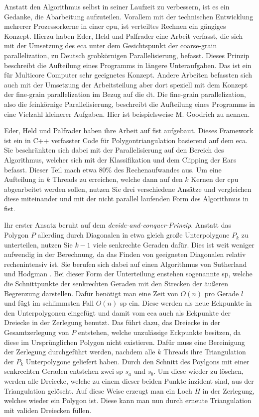 Anstatt den Algorithmus selbst in seiner Laufzeit zu verbessern, ist es ein Gedanke, die Abarbeitung aufzuteilen. Vorallem mit der technischen Entwicklung mehrerer Prozessorkerne in einer \ac{cpu},
ist verteiltes Rechnen ein gängiges Konzept. Hierzu haben Eder, Held und Palfrader eine Arbeit verfasst, die sich mit der Umsetzung des \ac{eca} unter dem Gesichtspunkt der coarse-grain parallelization,
zu Deutsch grobkörnigen Parallelisierung, befasst.\cite{paralleleca} Dieses Prinzip beschreibt die Aufteilung eines Programms in längere Unteraufgaben. Das ist ein für Multicore Computer sehr geeignetes Konzept.
Andere Arbeiten befassten sich auch mit der Umsetzung der Arbeitsteilung aber dort speziell mit dem Konzept der fine-grain parallelization im Bezug auf die \ac{dt}. Die fine-grain parallelization, also die feinkörnige 
Parallelisierung, beschreibt die Aufteilung eines Programms in eine Vielzahl kleinerer Aufgaben. 
Hier ist beispielsweise M. Goodrich\cite{goodrich} zu nennen.

Eder, Held und Palfrader haben ihre Arbeit auf \ac{fist} aufgebaut. Dieses Framework ist ein in C++ verfasster Code für Polygontriangulation basierend auf dem \ac{eca}.\cite{paralleleca}
Sie beschränkten sich dabei mit der Parallelisierung auf den Bereich des Algorithmus, welcher sich mit der Klassifikation und dem Clipping der Ears befasst. Dieser Teil mach etwa $80\%$ des Rechenaufwandes aus.
Um eine Aufteilung in $k$ Threads zu erreichen, welche dann auf den $k$ Kernen der \ac{cpu} abgearbeitet werden sollen, nutzen Sie drei verschiedene Ansätze und vergleichen diese miteinander und mit der nicht parallel 
laufenden Form des Algorithmus in \ac{fist}.

Ihr erster Ansatz beruht auf dem \emph{devide-and-conquer-Prinzip}. Anstatt das Polygon $P$ allerding durch Diagonalen in etwa gleich große Unterpolygone $P_k$ zu unterteilen, 
nutzen Sie $k-1$ viele senkrechte Geraden dafür. Dies ist weit weniger aufwendig in der Berechnung, da das Finden von geeigneten Diagonalen relativ rechenintensiv ist.
Sie berufen sich dabei auf einen Algorithmus von Sutherland und Hodgman \cite{dnc}. Bei dieser Form der Unterteilung enstehen sogenannte \ac{sp}, welche die Schnittpunkte der senkrechten Geraden mit 
den Strecken der äußeren Begrenzung darstellen. Dafür benötigt man eine Zeit von $O(n)$ pro Gerade $l$ und fügt im schlimmsten Fall $O(n)$ \ac{sp} ein. Diese werden als neue Eckpunkte in den Unterpolygonen eingefügt und damit vom \ac{eca} auch als Eckpunkte der Dreiecke in der Zerlegung benutzt. 
Das führt dazu, das Dreiecke in der Gesamtzerlegung von $P$ entstehen, welche unzulässige Eckpunkte besitzen, da diese im Ursprünglichen Polygon nicht existieren. 
Dafür muss eine Bereinigung der Zerlegung durchgeführt werden, nachdem alle $k$ Threads ihre Triangulation der $P_k$ Unterpolygone geliefert haben. 
Durch den Schnitt des Poylgons mit einer senkrechten Geraden entstehen zwei \ac{sp} $s_a$ und $s_b$. Um diese wieder zu löschen, werden alle Dreiecke, welche zu einem dieser beiden Punkte inzident sind, aus der Triangulation 
gelöscht. Auf diese Weise erzeugt man ein Loch $H$ in der Zerlegung, welches wieder ein Polygon ist. Diese kann man nun durch erneute Triangulation mit validen Dreiecken füllen. \linebreak 

